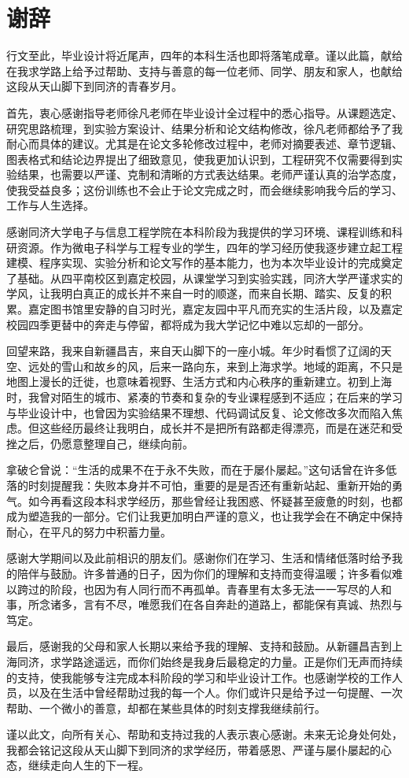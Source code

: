 \chapter*{谢辞}

行文至此，毕业设计将近尾声，四年的本科生活也即将落笔成章。谨以此篇，献给在我求学路上给予过帮助、支持与善意的每一位老师、同学、朋友和家人，也献给这段从天山脚下到同济的青春岁月。

首先，衷心感谢指导老师徐凡老师在毕业设计全过程中的悉心指导。从课题选定、研究思路梳理，到实验方案设计、结果分析和论文结构修改，徐凡老师都给予了我耐心而具体的建议。尤其是在论文多轮修改过程中，老师对摘要表述、章节逻辑、图表格式和结论边界提出了细致意见，使我更加认识到，工程研究不仅需要得到实验结果，也需要以严谨、克制和清晰的方式表达结果。老师严谨认真的治学态度，使我受益良多；这份训练也不会止于论文完成之时，而会继续影响我今后的学习、工作与人生选择。

感谢同济大学电子与信息工程学院在本科阶段为我提供的学习环境、课程训练和科研资源。作为微电子科学与工程专业的学生，四年的学习经历使我逐步建立起工程建模、程序实现、实验分析和论文写作的基本能力，也为本次毕业设计的完成奠定了基础。从四平南校区到嘉定校园，从课堂学习到实验实践，同济大学严谨求实的学风，让我明白真正的成长并不来自一时的顺遂，而来自长期、踏实、反复的积累。嘉定图书馆里安静的自习时光，嘉定友园中平凡而充实的生活片段，以及嘉定校园四季更替中的奔走与停留，都将成为我大学记忆中难以忘却的一部分。

回望来路，我来自新疆昌吉，来自天山脚下的一座小城。年少时看惯了辽阔的天空、远处的雪山和故乡的风，后来一路向东，来到上海求学。地域的距离，不只是地图上漫长的迁徙，也意味着视野、生活方式和内心秩序的重新建立。初到上海时，我曾对陌生的城市、紧凑的节奏和复杂的专业课程感到不适应；在后来的学习与毕业设计中，也曾因为实验结果不理想、代码调试反复、论文修改多次而陷入焦虑。但这些经历最终让我明白，成长并不是把所有路都走得漂亮，而是在迷茫和受挫之后，仍愿意整理自己，继续向前。

拿破仑曾说：“生活的成果不在于永不失败，而在于屡仆屡起。”这句话曾在许多低落的时刻提醒我：失败本身并不可怕，重要的是是否还有重新站起、重新开始的勇气。如今再看这段本科求学经历，那些曾经让我困惑、怀疑甚至疲惫的时刻，也都成为塑造我的一部分。它们让我更加明白严谨的意义，也让我学会在不确定中保持耐心，在平凡的努力中积蓄力量。

感谢大学期间以及此前相识的朋友们。感谢你们在学习、生活和情绪低落时给予我的陪伴与鼓励。许多普通的日子，因为你们的理解和支持而变得温暖；许多看似难以跨过的阶段，也因为有人同行而不再孤单。青春里有太多无法一一写尽的人和事，所念诸多，言有不尽，唯愿我们在各自奔赴的道路上，都能保有真诚、热烈与笃定。

最后，感谢我的父母和家人长期以来给予我的理解、支持和鼓励。从新疆昌吉到上海同济，求学路途遥远，而你们始终是我身后最稳定的力量。正是你们无声而持续的支持，使我能够专注完成本科阶段的学习和毕业设计工作。也感谢学校的工作人员，以及在生活中曾经帮助过我的每一个人。你们或许只是给予过一句提醒、一次帮助、一个微小的善意，却都在某些具体的时刻支撑我继续前行。

谨以此文，向所有关心、帮助和支持过我的人表示衷心感谢。未来无论身处何处，我都会铭记这段从天山脚下到同济的求学经历，带着感恩、严谨与屡仆屡起的心态，继续走向人生的下一程。
